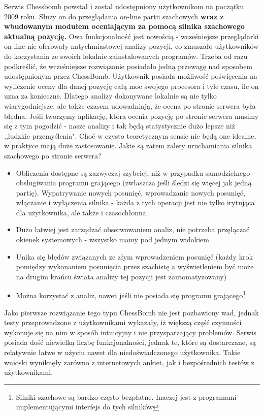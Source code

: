 \documentclass[12pt,leqno]{article}
\begin{document}
Serwis Chessbomb powstał i został udostępniony użytkownikom na początku 2009 roku. Służy on do przeglądania on-line partii szachowych {\bf wraz z wbudowanym modułem oceniającym za pomocą silnika szachowego aktualną pozycję.} Owa funkcjonalność jest nowością - wcześniejsze przeglądarki on-line nie oferowały natychmiastowej analizy pozycji, co zmuszało użytkowników do korzystania ze swoich lokalnie zainstalowanych programów. Trzeba od razu podkreślić, że wcześniejsze rozwiązanie posiadało jedną przewagę nad sposobem udostępnionym przez ChessBomb. Użytkownik posiada możliwość poświęcenia na wyliczenie oceny dla danej pozycję całą moc swojego procesora i tyle czasu, ile on uzna za konieczne. Dlatego analizy dokonywane lokalnie są nie tylko wiarygodniejsze, ale także czasem udowadniają, że ocena po stronie serwera była błędna. Jeśli tworzymy aplikację, która ocenia pozycję po stronie serwera musimy się z tym pogodzić - nasze analizy i tak będą statystycznie dużo lepsze niż ,,ludzkie przemyślenia". Choć w czysto teoretycznym sensie nie będą one idealne, w praktyce mają duże zastosowanie. Jakie są zatem zalety uruchamiania silnika szachowego po stronie serwera?
\begin{itemize}
\item Obliczenia dostępne są zazwyczaj szybciej, niż w przypadku samodzielnego obsługiwania programu grającego (zwłaszcza jeśli śledzi się więcej jak jedną partię). Wypatrywanie nowych posunięć, wprowadzanie nowych posunięć, włączanie i wyłączenia silnika - każda z tych operacji jest nie tylko irytująca dla użytkownika, ale także i czasochłonna.
\item Dużo łatwiej jest zarządzać obserwowaniem analiz, nie potrzeba przęłączać okienek systemowych - wszystko mamy pod jednym widokiem
\item Unika się błędów związanych ze złym wprowadzeniem posunięć (każdy krok pomiędzy wykonaniem posunięcia przez szachistę a wyświetleniem być może na drugim krańcu świata analizy tej pozycji jest zautomatyzowany)
\item Można korzystać z analiz, nawet jeśli nie posiada się programu grającego\footnote{Silniki szachowe są bardzo często bezpłatne. Inaczej jest z programami implementującymi interfejs do tych silników}
\end{itemize} 
Jako pierwsze rozwiązanie tego typu ChessBomb nie jest pozbawiony wad, jednak testy przeprowadzone z użytkownikami wykazały, iż większą część czynności wykonuje się na nim w sposób intuicyjny i nie przysparzający problemów. Serwis posiada dość niewielką liczbę funkcjonalności, jednak te, które są dostarczane, są relatywnie łatwe w użyciu nawet dla niedoświadczonego użytkownika. Takie wnioski wyniknęły zarówno z internetowych ankiet, jak i bezpośrednich testów z użytkownikami.\\
\end{document}
